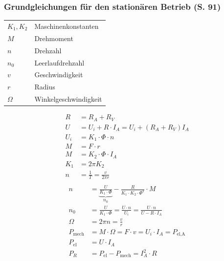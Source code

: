 \documentclass[a4paper,twocolumn,10pt]{article}
\begin{document}
\subsubsection{Grundgleichungen für den stationären Betrieb (S. 91)}
\begin{tabular}{ll}
$K_1,K_2$ & Maschinenkonstanten\\
$M$ & Drehmoment\\
$n$ & Drehzahl\\
$n_0$ & Leerlaufdrehzahl\\
$v$ & Geschwindigkeit\\
$r$ & Radius\\
$\Omega$ & Winkelgeschwindigkeit
\end{tabular}
\begin{equation*}
\begin{split}
R&=R_A+R_V\\
U&=U_i+R\cdot I_A=U_i+(R_A+R_V)I_A\\
U_i&=K_1\cdot\Phi\cdot n\\
M&=F\cdot r\\
M&=K_2\cdot\Phi\cdot I_A\\
K_1&=2\pi K_2\\
n&=\frac{1}{T}=\frac{v}{2\pi r}\\
\end{split}
\end{equation*}
\begin{equation*}
\begin{split}
n&=\underbrace{\frac{U}{K_1\cdot \Phi}}_{n_0}-\frac{R}{K_1\cdot K_2\cdot\Phi^2}\cdot M\\
n_0&=\frac{U}{K_1\cdot\Phi}=\frac{U\cdot n}{U_i}=\frac{U\cdot n}{U-R\cdot I_A}\\
\Omega&=2\pi n=\frac{v}{r}\\
P_{\text{mech}}&=M\cdot\Omega=F\cdot v=U_i\cdot I_A=P_{\text{el,A}}\\
P_{\text{el}}&=U\cdot I_A\\
P_R&=P_{\text{el}}-P_{\text{mech}}=I_A^2\cdot R
\end{split}
\end{equation*}
\end{document}
